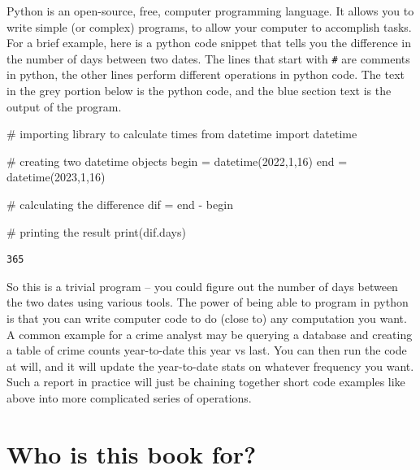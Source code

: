 \documentclass[
  letterpaper,
]{scrbook}
\newenvironment{Shaded}{\begin{snugshade}}{\end{snugshade}}
\newcommand{\BuiltInTok}[1]{\textcolor[rgb]{0.00,0.23,0.31}{#1}}
\newcommand{\CommentTok}[1]{\textcolor[rgb]{0.37,0.37,0.37}{#1}}
\newcommand{\DecValTok}[1]{\textcolor[rgb]{0.68,0.00,0.00}{#1}}
\newcommand{\ImportTok}[1]{\textcolor[rgb]{0.00,0.46,0.62}{#1}}
\newcommand{\NormalTok}[1]{\textcolor[rgb]{0.00,0.23,0.31}{#1}}
\newcommand{\OperatorTok}[1]{\textcolor[rgb]{0.37,0.37,0.37}{#1}}
\begin{document}

Python is an open-source, free, computer programming language. It allows
you to write simple (or complex) programs, to allow your computer to
accomplish tasks. For a brief example, here is a python code snippet
that tells you the difference in the number of days between two dates.
The lines that start with \texttt{\#} are comments in python, the other
lines perform different operations in python code. The text in the grey
portion below is the python code, and the blue section text is the
output of the program.

\begin{Shaded}
\begin{Highlighting}[]
\CommentTok{\# importing library to calculate times}
\ImportTok{from}\NormalTok{ datetime }\ImportTok{import}\NormalTok{ datetime}

\CommentTok{\# creating two datetime objects}
\NormalTok{begin }\OperatorTok{=}\NormalTok{ datetime(}\DecValTok{2022}\NormalTok{,}\DecValTok{1}\NormalTok{,}\DecValTok{16}\NormalTok{)}
\NormalTok{end }\OperatorTok{=}\NormalTok{ datetime(}\DecValTok{2023}\NormalTok{,}\DecValTok{1}\NormalTok{,}\DecValTok{16}\NormalTok{)}

\CommentTok{\# calculating the difference}
\NormalTok{dif }\OperatorTok{=}\NormalTok{ end }\OperatorTok{{-}}\NormalTok{ begin}

\CommentTok{\# printing the result}
\BuiltInTok{print}\NormalTok{(dif.days)}
\end{Highlighting}
\end{Shaded}

\begin{verbatim}
365
\end{verbatim}

So this is a trivial program -- you could figure out the number of days
between the two dates using various tools. The power of being able to
program in python is that you can write computer code to do (close to)
any computation you want. A common example for a crime analyst may be
querying a database and creating a table of crime counts year-to-date
this year vs last. You can then run the code at will, and it will update
the year-to-date stats on whatever frequency you want. Such a report in
practice will just be chaining together short code examples like above
into more complicated series of operations.

\section*{Who is this book for?}\label{who-is-this-book-for}
\end{document}
